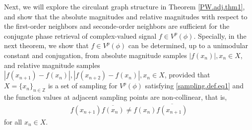 \documentclass[12pt,oneside,reqno]{amsart}
\newcommand{\Z}{\mathbb{Z}}
\numberwithin{equation}{section}
\begin{document}
	
	Next, we will explore the circulant graph structure in Theorem \ref{PW.adj.thm1}, and show that the absolute magnitudes and relative magnitudes with respect to the first-order
	neighbors and seconde-order neighbors are sufficient for the conjugate phase retrieval of complex-valued signal $f\in V^p(\phi)$. Specially, in the next theorem, we show that $f\in V^p(\phi)$ can be determined, up to a unimodular constant and conjugation, from absolute magnitude samples $|f(x_n)|,x_n\in X$, and relative magnitude samples $|f(x_{n+1})-f(x_n)|, |f(x_{n+2})-f(x_n)|, x_n\in X$, provided that $X=\{x_n\}_{n\in \Z}$ is a set of sampling for $V^p(\phi)$ satisfying \eqref{sampling.def.eq1} and the function values at adjacent sampling points are non-collinear, that is,
	\begin{align}\label{eq91}
		f(x_{n+1})\overline{f(x_n)} \ne f(x_n) \overline{f(x_{n+1})}
	\end{align}
	for all $x_n\in X$.
\end{document}
